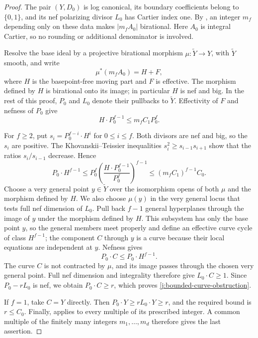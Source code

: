 \documentclass[12pt,a4paper,psamsfonts]{amsart}
\theoremstyle{definition}
\theoremstyle{plain}
\begin{document}
\begin{proof}
The pair $(Y,D_0)$ is log canonical, its boundary coefficients belong
to $\{0,1\}$, and its nef polarizing divisor $L_0$ has Cartier index
one.  By \cite[Theorem~1.3]{BZ}, an integer $m_f$ depending only on
these data makes $|m_fA_0|$ birational.  Here $A_0$ is integral
Cartier, so no rounding or additional denominator is involved.

Resolve the base ideal by a projective birational morphism
$\mu:\widetilde Y\to Y$, with $\widetilde Y$ smooth, and write
\[
 \mu^*(m_fA_0)=H+F,
\]
where $H$ is the basepoint-free moving part and $F$ is effective.
The morphism defined by $H$ is birational onto its image; in
particular $H$ is nef and big.  In the rest of this proof, $P_0$
and $L_0$ denote their pullbacks to $\widetilde Y$.  Effectivity
of $F$ and nefness of $P_0$ give
\begin{equation}
\label{j:moving-adjoint-degree}
 H\cdot P_0^{f-1}\leq m_fC_1P_0^f.
\end{equation}

For $f\geq2$, put $s_i=P_0^{f-i}\cdot H^i$ for $0\leq i\leq f$.
Both divisors are nef and big, so the $s_i$ are positive.  The
Khovanskii--Teissier inequalities
\cite[Corollary~1.6.3(i) and Example~1.6.4]{LazarsfeldPAGI}
$s_i^2\geq s_{i-1}s_{i+1}$ show
that the ratios $s_i/s_{i-1}$ decrease.  Hence
\begin{equation}
\label{j:mixed-degree}
 P_0\cdot H^{f-1}
 \leq P_0^f\left(\frac{H\cdot P_0^{f-1}}{P_0^f}\right)^{f-1}
 \leq(m_fC_1)^{f-1}C_0.
\end{equation}
Choose a very general point $y\in\widetilde Y$ over the
isomorphism opens of both $\mu$ and the morphism defined by $H$.
We also choose $\mu(y)$ in the very general locus
that tests full nef dimension of $L_0$.  Pull back $f-1$ general
hyperplanes through the image of $y$ under the morphism defined
by $H$.  This subsystem has only the base point $y$, so the
general members meet properly and define an effective curve cycle
of class $H^{f-1}$; the component $C$ through $y$ is a curve
because their local equations are independent at $y$.
Nefness gives
\[
 P_0\cdot C\leq P_0\cdot H^{f-1}.
\]
The curve $C$ is not contracted by $\mu$, and its image passes
through the chosen very general point.  Full nef dimension and
integrality therefore give $L_0\cdot C\geq1$.  Since
$P_0-rL_0$ is nef, we obtain $P_0\cdot C\geq r$, which proves
\eqref{j:bounded-curve-obstruction}.

If $f=1$, take $C=Y$ directly.  Then
$P_0\cdot Y\geq rL_0\cdot Y\geq r$, and the required bound is
$r\leq C_0$.  Finally, \cite[Theorem~1.3]{BZ} applies to every
multiple of its prescribed integer.  A common multiple of the
finitely many integers $m_1,\ldots,m_d$ therefore gives the last
assertion.
\end{proof}
\end{document}
